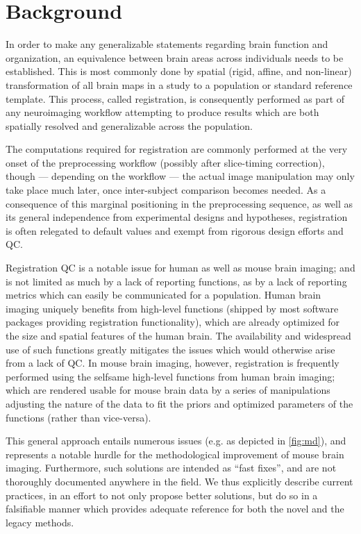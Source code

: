 \section{Background}
\label{sec:bg}

In order to make any generalizable statements regarding brain function and organization, an equivalence between brain areas across individuals needs to be established.
This is most commonly done by spatial (rigid, affine, and non-linear) transformation of all brain maps in a study to a population or standard reference template.
This process, called registration, is consequently performed as part of any neuroimaging workflow attempting to produce results which are both spatially resolved and generalizable across the population.

The computations required for registration are commonly performed at the very onset of the preprocessing workflow (possibly after slice-timing correction),
though --- depending on the workflow --- the actual image manipulation may only take place much later, once inter-subject comparison becomes needed.
As a consequence of this marginal positioning in the preprocessing sequence, as well as its general independence from experimental designs and hypotheses, registration is often relegated to default values and exempt from rigorous design efforts and QC.

Registration QC is a notable issue for human as well as mouse brain imaging;
and is not limited as much by a lack of reporting functions, as by a lack of reporting metrics which can easily be communicated for a population.
Human brain imaging uniquely benefits from high-level functions (shipped by most software packages providing registration functionality), which are already optimized for the size and spatial features of the human brain.
The availability and widespread use of such functions greatly mitigates the issues which would otherwise arise from a lack of QC.
In mouse brain imaging, however, registration is frequently performed using the selfsame high-level functions from human brain imaging; which are rendered usable for mouse brain data by a series of manipulations adjusting the nature of the data to fit the priors and optimized parameters of the functions (rather than vice-versa).

This general approach entails numerous issues (e.g. as depicted in \cref{fig:md}), and represents a notable hurdle for the methodological improvement of mouse brain imaging.
Furthermore, such solutions are intended as “fast fixes”, and are not thoroughly documented anywhere in the field.
We thus explicitly describe current practices, in an effort to not only propose better solutions, but do so in a falsifiable manner which provides adequate reference for both the novel and the legacy methods.

